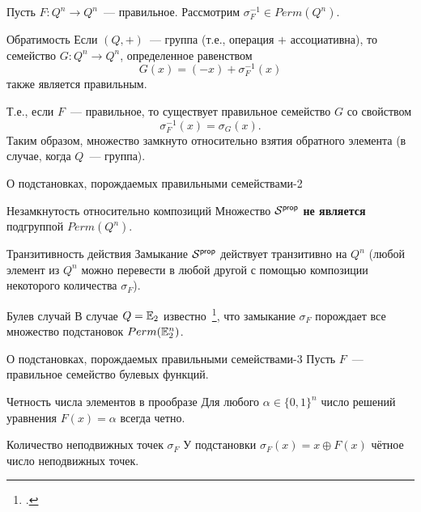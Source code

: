 \begin{frame}%
    Пусть $F \colon Q^n \to Q^n$~--- правильное.
    Рассмотрим $\sigma^{-1}_F \in Perm(Q^n)$.
    \begin{mytheorem}{Обратимость }
        Если $(Q, +)$~--- группа (т.е., операция $+$ ассоциативна), то семейство $G \colon Q^n \to Q^n$, определенное равенством
        \[
            G(x) = (-x) + \sigma_F^{-1}(x)
        \]
        также является правильным.
    \end{mytheorem}
    \pause
    Т.е., если $F$~--- правильное, то существует правильное семейство $G$ со свойством
    \[
        \sigma^{-1}_F(x) = \sigma_G(x).
    \]
    \pause
    Таким образом, множество  замкнуто относительно взятия обратного элемента (в случае, когда $Q$~--- группа).
\end{frame}


\begin{frame}{О подстановках, порождаемых правильными семействами-2}
    \begin{mytheorem}{Незамкнутость относительно композиций}
        Множество $\mathcal{S}^{\mathsf{prop}}$ \textbf{не является} подгруппой $Perm(Q^n)$.
    \end{mytheorem}
    \pause 
    \begin{mytheorem}{Транзитивность действия}
        Замыкание $\mathcal{S}^{\mathsf{prop}}$ действует транзитивно на $Q^n$ (любой элемент из $Q^n$ можно перевести в любой другой с помощью композиции некоторого количества $\sigma_{F}$).
    \end{mytheorem}
    \pause 
    \begin{mypropos}{Булев случай}
        В случае $Q = \mathbb{E}_2$ известно~\footcite{USOphd}, что замыкание $\sigma_F$ порождает все множество подстановок $Perm(\mathbb{E}_2^n)$.
    \end{mypropos}
\end{frame}


\begin{frame}{О подстановках, порождаемых правильными семействами-3}
    Пусть $F$~--- правильное семейство булевых функций.
    \begin{mytheorem}{Четность числа элементов в прообразе}
    \label{thm:preimage}
        Для любого $\alpha \in \{0, 1\}^n$ число решений уравнения $F(x) = \alpha$ всегда четно.
    \end{mytheorem}
    \pause
    \begin{mytheorem}{Количество неподвижных точек $\sigma_F$}
        У подстановки $\sigma_F(x) = x \oplus F(x)$ чётное число неподвижных точек.
    \end{mytheorem}
\end{frame}



